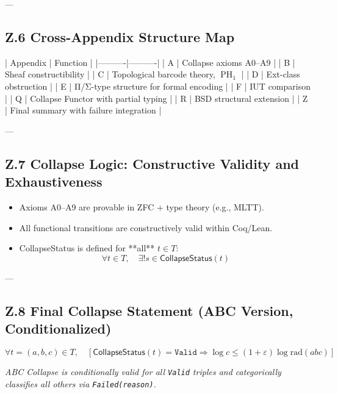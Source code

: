 \documentclass[11pt]{article}
\DeclareMathOperator{\PH}{PH}
\begin{document}
---

\subsection*{Z.6 Cross-Appendix Structure Map}

| Appendix | Function |
|----------|----------|
| A | Collapse axioms A0–A9 |
| B | Sheaf constructibility |
| C | Topological barcode theory, \( \PH_1 \) |
| D | Ext-class obstruction |
| E | Π/Σ-type structure for formal encoding |
| F | IUT comparison |
| Q | Collapse Functor with partial typing |
| R | BSD structural extension |
| Z | Final summary with failure integration |

---

\subsection*{Z.7 Collapse Logic: Constructive Validity and Exhaustiveness}

\begin{itemize}
  \item Axioms A0–A9 are provable in ZFC + type theory (e.g., MLTT).
  \item All functional transitions are constructively valid within Coq/Lean.
  \item CollapseStatus is defined for **all** \( t \in T \):  
  \[
  \forall t \in T,\quad \exists! s \in \mathsf{CollapseStatus}(t)
  \]
\end{itemize}

---

\subsection*{Z.8 Final Collapse Statement (ABC Version, Conditionalized)}

\[
\forall t = (a,b,c) \in T,\quad
\left[
  \mathsf{CollapseStatus}(t) = \texttt{Valid}
  \Rightarrow
  \log c \leq (1+\varepsilon)\log \mathrm{rad}(abc)
\right]
\]

\begin{center}
\textit{ABC Collapse is conditionally valid for all \texttt{Valid} triples and categorically classifies all others via \texttt{Failed(reason)}.}
\end{center}
\end{document}
